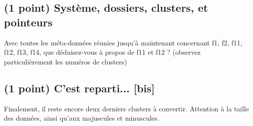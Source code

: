 \documentclass[11pt,a4paper]{article}
\begin{document}
\newpage


\subsection{(1 point) Système, dossiers, clusters, et pointeurs}

\noindent Avec toutes les méta-données réunies jusqu'à maintenant concernant f1, f2, f11, f12, f13, f14, que déduisez-vous à propos de f11 et f12 ? (observez particulièrement les numéros de clusters)

\bigskip


\bigskip


\subsection{(1 point) C'est reparti... [bis]}

\noindent Finalement, il reste encore deux derniers clusters à convertir.
Attention à la taille des données, ainsi qu'aux majuscules et minuscules.
\end{document}
